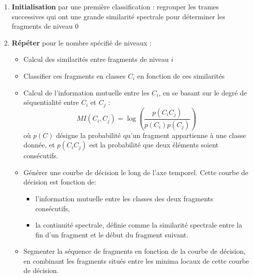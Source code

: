   \begin{enumerate}
    \item \textbf{Initialisation} par une première classification : regrouper les trames successives qui ont une grande similarité spectrale pour déterminer les fragments de niveau 0
    \item \textbf{Répéter} pour le nombre spécifié de niveaux :
    \begin{itemize}
      \item Calcul des similarités entre fragments de niveau $i$
      \item Classifier ces fragments en classes $C_i$ en fonction de ces similarités
      \item Calcul de l'information mutuelle entre les $C_i$, en se basant sur le degré de séquentialité entre $C_i$ et $C_j$ :
      \[ MI \left( C_i, C_j \right) = \log \left(\frac{p\left(C_iC_j\right)}{p\left(C_i\right)p\left(C_j\right)}\right) \]
      où $p(C)$ désigne la probabilité qu'un fragment appartienne à une classe donnée, et $p(C_iC_j)$ est la probabilité que deux éléments soient consécutifs.
      \item Générer une courbe de décision le long de l'axe temporel. Cette courbe de décision est fonction de:
      \begin{itemize}
        \item l'information mutuelle entre les classes des deux fragments consécutifs,
        \item la continuité spectrale, définie comme la similarité spectrale entre la fin d'un fragment et le début du fragment suivant.
      \end{itemize}
      \item Segmenter la séquence de fragments en fonction de la courbe de décision, en combinant les fragments situés entre les minima locaux de cette courbe de décision.
    \end{itemize}
  \end{enumerate}


